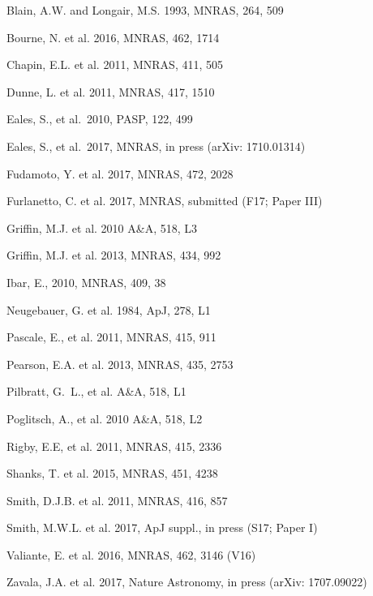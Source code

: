 \documentclass[useAMS,usenatbib]{mnras}
\def\pasp{PASP}
\begin{document}
\begin{thebibliography}{}

 Blain, A.W. and Longair, M.S. 1993,
MNRAS, 264, 509

 Bourne, N. et al. 2016, MNRAS, 462, 1714

 Chapin, E.L. et al. 2011, MNRAS, 411, 505

 Dunne, L. et al. 2011, MNRAS, 417, 1510

 Eales, S., et al.\ 2010,  \pasp, 122, 499 

 Eales, S., et al.\ 2017, MNRAS, in press
(arXiv: 1710.01314)

 Fudamoto, Y. et al. 2017,
MNRAS, 472, 2028

 Furlanetto, C. et al. 2017,
MNRAS, submitted (F17; Paper III)

 Griffin, M.J. et al. 2010 A\&A, 518, L3

 Griffin, M.J. et al. 2013,
MNRAS, 434, 992

 Ibar, E., 2010, MNRAS, 409, 38

 Neugebauer, G. et al. 1984,
ApJ, 278, L1

 Pascale, E., et al. 2011, MNRAS, 415, 911 

 Pearson, E.A. et al. 2013, MNRAS, 435,
2753

 Pilbratt, G.~L., et al. A\&A, 518, L1

 Poglitsch, A., et al. 2010 A\&A, 518, L2

 Rigby, E.E, et al. 2011, MNRAS, 415, 2336 

 Shanks, T. et al. 2015, MNRAS, 451, 4238

 Smith, D.J.B. et al. 2011, MNRAS, 
416, 857

 Smith, M.W.L. et al. 2017, ApJ suppl., in press
(S17; Paper I)

 Valiante, E. et al. 2016, MNRAS, 462, 3146
(V16)

 Zavala, J.A. et al. 2017, Nature Astronomy,
in press (arXiv: 1707.09022)

\end{thebibliography}
\label{lastpage}
\end{document}

